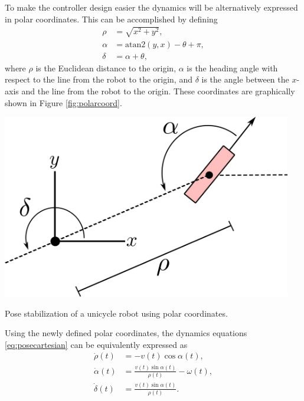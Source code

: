 \begin{example}
To make the controller design easier the dynamics will be alternatively expressed in polar coordinates. This can be accomplished by defining
\begin{equation} \label{eq:polarcoord}
\begin{split}
\rho &= \sqrt{x^2+y^2}, \\
\alpha &= \mathrm{atan2}(y, x) - \theta + \pi, \\
\delta &= \alpha + \theta,
\end{split}
\end{equation}
where $\rho$ is the Euclidean distance to the origin, $\alpha$ is the heading angle with respect to the line from the robot to the origin, and $\delta$ is the angle between the $x$-axis and the line from the robot to the origin. These coordinates are graphically shown in Figure \ref{fig:polarcoord}.
\begin{marginfigure}
\centering
\includegraphics[width=0.95\textwidth]{tex/figs/ch03_figs/unicycle_polar.png}
\caption{Pose stabilization of a unicycle robot using polar coordinates.}
\label{fig:polarcoord}
\end{marginfigure}
Using the newly defined polar coordinates, the dynamics equations \eqref{eq:posecartesian} can be equivalently expressed as
\begin{equation} \label{eq:posepolar}
\begin{split}
\dot{\rho}(t) &= -v(t) \cos\alpha(t), \\
\dot{\alpha}(t) &= \frac{v(t) \sin\alpha(t)}{\rho(t)} - \omega(t), \\
\dot{\delta}(t) &= \frac{v(t) \sin \alpha(t)}{\rho(t)}. \\
\end{split}
\end{equation}


\end{example}
